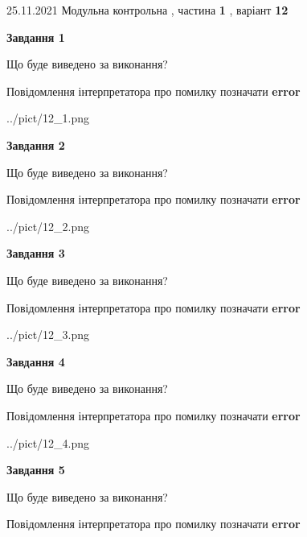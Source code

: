 \documentclass[10pt, ukrainian]{article}
\begin{document}
{25.11.2021 Модульна контрольна , частина \textbf { 1 }, варіант  \No \textbf { 12 }\par}
{
\begin {large}

{\begin {center}\textbf{Завдання 1}\end {center}}\par
Що буде виведено за виконання? \par
Повідомлення інтерпретатора про помилку позначати \textbf{error}

\begin{center}
	{../pict/12_1.png}
\end{center}
\newpage

{\begin {center}\textbf{Завдання 2}\end {center}}\par
Що буде виведено за виконання? \par
Повідомлення інтерпретатора про помилку позначати \textbf{error}

\begin{center}
	{../pict/12_2.png}
\end{center}
\newpage

{\begin {center}\textbf{Завдання 3}\end {center}}\par
Що буде виведено за виконання? \par
Повідомлення інтерпретатора про помилку позначати \textbf{error}

\begin{center}
	{../pict/12_3.png}
\end{center}
\newpage

{\begin {center}\textbf{Завдання 4}\end {center}}\par
Що буде виведено за виконання? \par
Повідомлення інтерпретатора про помилку позначати \textbf{error}

\begin{center}
	{../pict/12_4.png}
\end{center}
\newpage

{\begin {center}\textbf{Завдання 5}\end {center}}\par
Що буде виведено за виконання? \par
Повідомлення інтерпретатора про помилку позначати \textbf{error}


\end{large}}
\end{document}
